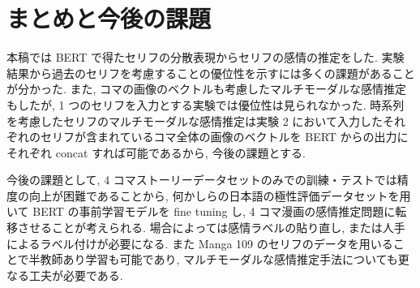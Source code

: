 \documentclass[twocolumn]{jarticle}     %
\begin{document}
\section{まとめと今後の課題}
本稿では BERT で得たセリフの分散表現からセリフの感情の推定をした. 実験結果から過去のセリフを考慮することの優位性を示すには多くの課題があることが分かった. また, コマの画像のベクトルも考慮したマルチモーダルな感情推定もしたが, 1 つのセリフを入力とする実験では優位性は見られなかった. 時系列を考慮したセリフのマルチモーダルな感情推定は実験 2 において入力したそれぞれのセリフが含まれているコマ全体の画像のベクトルを BERT からの出力にそれぞれ concat すれば可能であるから, 今後の課題とする.

今後の課題として, 4 コマストーリーデータセットのみでの訓練・テストでは精度の向上が困難であることから, 何かしらの日本語の極性評価データセットを用いて BERT の事前学習モデルを fine tuning し, 4 コマ漫画の感情推定問題に転移させることが考えられる. 場合によっては感情ラベルの貼り直し, または人手によるラベル付けが必要になる. また Manga 109 のセリフのデータを用いることで半教師あり学習も可能であり, マルチモーダルな感情推定手法についても更なる工夫が必要である.


\begin{table}[!b]
\begin{center}
\caption{実験 1 結果(評価用データ)}
\label{table:result_1}
\end{center}
\end{table}
\end{document}
